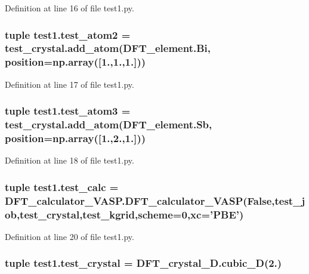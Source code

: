 Definition at line 16 of file test1.\+py.

\hypertarget{namespacetest1_a8497562cdeb1db7074c872cc5e2b1868}{
\subsubsection[{test\+\_\+atom2}]{\setlength{\rightskip}{0pt plus 5cm}tuple test1.\+test\+\_\+atom2 = test\+\_\+crystal.\+add\+\_\+atom(D\+F\+T\+\_\+element.\+Bi, position=np.\+array(\mbox{[}1.,1.,1.\mbox{]}))}}\label{namespacetest1_a8497562cdeb1db7074c872cc5e2b1868}


Definition at line 17 of file test1.\+py.

\hypertarget{namespacetest1_ab569ecccdcd6abf89fa3ba8a36e352d0}{
\subsubsection[{test\+\_\+atom3}]{\setlength{\rightskip}{0pt plus 5cm}tuple test1.\+test\+\_\+atom3 = test\+\_\+crystal.\+add\+\_\+atom(D\+F\+T\+\_\+element.\+Sb, position=np.\+array(\mbox{[}1.,2.,1.\mbox{]}))}}\label{namespacetest1_ab569ecccdcd6abf89fa3ba8a36e352d0}


Definition at line 18 of file test1.\+py.

\hypertarget{namespacetest1_a87415327a2d33f0c12dd9e2b746a94d0}{
\subsubsection[{test\+\_\+calc}]{\setlength{\rightskip}{0pt plus 5cm}tuple test1.\+test\+\_\+calc = D\+F\+T\+\_\+calculator\+\_\+\+V\+A\+S\+P.\+D\+F\+T\+\_\+calculator\+\_\+\+V\+A\+S\+P(False,{\bf test\+\_\+job},{\bf test\+\_\+crystal},{\bf test\+\_\+kgrid},scheme=0,xc='P\+B\+E')}}\label{namespacetest1_a87415327a2d33f0c12dd9e2b746a94d0}


Definition at line 20 of file test1.\+py.

\hypertarget{namespacetest1_a50fd026a5228d16663c95a2d68f4ea82}{
\subsubsection[{test\+\_\+crystal}]{\setlength{\rightskip}{0pt plus 5cm}tuple test1.\+test\+\_\+crystal = D\+F\+T\+\_\+crystal\+\_\+D.\+cubic\+\_\+D(2.)}}\label{namespacetest1_a50fd026a5228d16663c95a2d68f4ea82}


